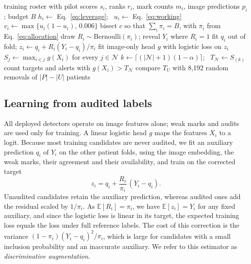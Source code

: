 \begin{algorithm}[t]
\caption{Paired-tail audit and score-fixed reference replay}
\label{alg:audit}
\small
\begin{algorithmic}[1]
\Require training roster with pilot scores $s_i$, ranks $r_i$, mark counts $m_i$, image predictions $p_i$; budget $B$
\State $h_i\gets$ Eq.~\eqref{eq:leverage}; \ $u_i\gets$ Eq.~\eqref{eq:working}
\State $v_i\gets\max\{u_i(1-u_i),\,0.006\}$
\State bisect $c$ so that $\sum_i\pi_i=B$, with $\pi_i$ from Eq.~\eqref{eq:allocation}
\State draw $R_i\sim\mathrm{Bernoulli}(\pi_i)$; reveal $Y_i$ where $R_i=1$
\State fit $q_i$ out of fold; $z_i\gets q_i+R_i(Y_i-q_i)/\pi_i$
\State fit image-only head $g$ with logistic loss on $z_i$
 
\State $S_j\gets\max_{i\in j} g(X_i)$ for every $j\in\mathcal N$
\State $k\gets\lceil(|\mathcal N|+1)(1-\alpha)\rceil$; \ $T_{\mathcal N}\gets S_{(k)}$
\State count targets and alerts with $g(X_i)>T_{\mathcal N}$
\EndFor
\State compare $T_U$ with 8,192 random removals of $|P|-|U|$ patients
\end{algorithmic}
\end{algorithm}

\subsection{Learning from audited labels}
\label{sec:training}

All deployed detectors operate on image features alone; weak marks and audits are used only for training. A linear logistic head $g$ maps the features $X_i$ to a logit. Because most training candidates are never audited, we fit an auxiliary prediction $q_i$ of $Y_i$ on the other patient folds, using the image embedding, the weak marks, their agreement and their availability, and train on the corrected target
\begin{equation}
 z_i=q_i+\frac{R_i}{\pi_i}\,(Y_i-q_i).
 \label{eq:augmentation}
\end{equation}
Unaudited candidates retain the auxiliary prediction, whereas audited ones add the residual scaled by $1/\pi_i$. As $\mathbb E[R_i]=\pi_i$, we have $\mathbb E[z_i]=Y_i$ for any fixed auxiliary, and since the logistic loss is linear in its target, the expected training loss equals the loss under full reference labels. The cost of this correction is the variance $(1-\pi_i)(Y_i-q_i)^2/\pi_i$, which is large for candidates with a small inclusion probability and an inaccurate auxiliary. We refer to this estimator as \emph{discriminative augmentation}.


